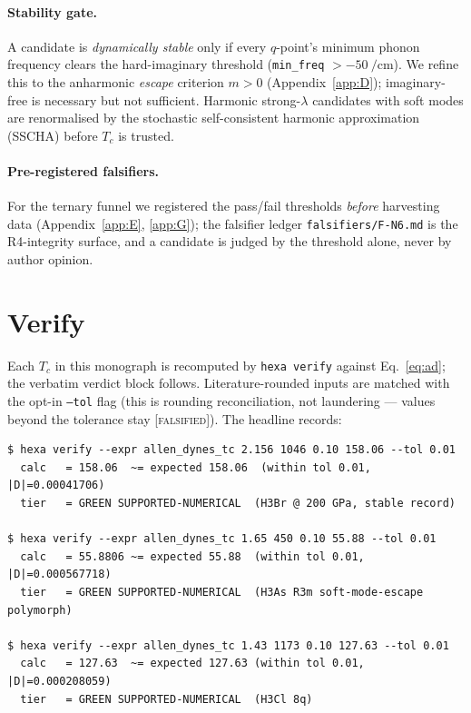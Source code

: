 \documentclass[11pt,a4paper]{article}
\newcommand{\tierRed}{\textcolor{red!75!black}{[\textsc{falsified}]}}
\begin{document}
\paragraph{Stability gate.}
A candidate is \emph{dynamically stable} only if every $q$-point's minimum
phonon frequency clears the hard-imaginary threshold (\texttt{min\_freq}
$> -\SI{50}{\per\centi\meter}$). We refine this to the anharmonic
\emph{escape} criterion $m > 0$ (Appendix~\ref{app:D}); imaginary-free is
necessary but not sufficient. Harmonic strong-$\lambda$ candidates with soft
modes are renormalised by the stochastic self-consistent harmonic
approximation (SSCHA) before $T_c$ is trusted.

\paragraph{Pre-registered falsifiers.}
For the ternary funnel we registered the pass/fail thresholds \emph{before}
harvesting data (Appendix~\ref{app:E}, \ref{app:G}); the falsifier ledger
\texttt{falsifiers/F-N6.md} is the R4-integrity surface, and a candidate is
judged by the threshold alone, never by author opinion.

\section{Verify}
\label{sec:verify}

Each $T_c$ in this monograph is recomputed by \texttt{hexa verify} against
Eq.~\eqref{eq:ad}; the verbatim verdict block follows. Literature-rounded
inputs are matched with the opt-in \texttt{--tol} flag (this is rounding
reconciliation, not laundering --- values beyond the tolerance stay
\tierRed). The headline records:

\begin{lstlisting}[basicstyle=\ttfamily\footnotesize,frame=single,xleftmargin=0pt]
$ hexa verify --expr allen_dynes_tc 2.156 1046 0.10 158.06 --tol 0.01
  calc   = 158.06  ~= expected 158.06  (within tol 0.01, |D|=0.00041706)
  tier   = GREEN SUPPORTED-NUMERICAL  (H3Br @ 200 GPa, stable record)

$ hexa verify --expr allen_dynes_tc 1.65 450 0.10 55.88 --tol 0.01
  calc   = 55.8806 ~= expected 55.88  (within tol 0.01, |D|=0.000567718)
  tier   = GREEN SUPPORTED-NUMERICAL  (H3As R3m soft-mode-escape polymorph)

$ hexa verify --expr allen_dynes_tc 1.43 1173 0.10 127.63 --tol 0.01
  calc   = 127.63  ~= expected 127.63 (within tol 0.01, |D|=0.000208059)
  tier   = GREEN SUPPORTED-NUMERICAL  (H3Cl 8q)
\end{lstlisting}
\end{document}
